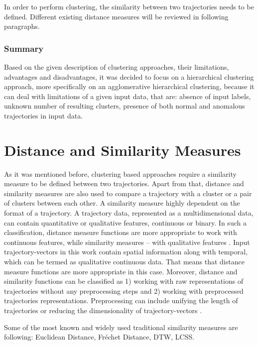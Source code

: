In order to perform clustering, the similarity between two trajectories needs to be defined. Different existing distance measures will be reviewed in following paragraphs.

\subsubsection{Summary}

Based on the given description of clustering approaches, their limitations, advantages and disadvantages, it was decided to focus on a hierarchical clustering approach, more specifically on an agglomerative hierarchical clustering, because it can deal with limitations of a given input data, that are: absence of input labels, unknown number of resulting clusters, presence of both normal and anomalous trajectories in input data.

\section{Distance and Similarity Measures}

As it was mentioned before, clustering based approaches require a similarity measure to be defined between two trajectories. Apart from that, distance and similarity measures are also used to compare a trajectory with a cluster or a pair of clusters between each other. A similarity measure highly dependent on the format of a trajectory. A trajectory data, represented as a multidimensional data, can contain quantitative or qualitative features, continuous or binary. In such a classification, distance measure functions are more appropriate to work with continuous features, while similarity measures – with qualitative features \cite{article:23_survey_ca}. Input trajectory-vectors in this work contain spatial information along with temporal, which can be termed as qualitative continuous data. That means that distance measure functions are more appropriate in this case. Moreover, distance and similarity functions can be classified as 1) working with raw representations of trajectories without any preprocessing steps and 2) working with preprocessed trajectories representations. Preprocessing can include unifying the length of trajectories or reducing the dimensionality of trajectory-vectors \cite{inproceedings:7_related_work}. 

Some of the most known and widely used traditional similarity measures are following: Euclidean Distance, Fréchet Distance, DTW, LCSS.


